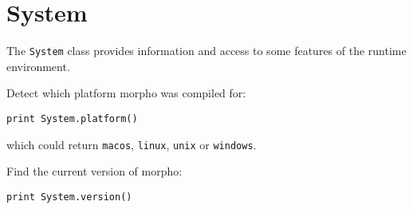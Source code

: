 \hypertarget{system}{%
\section{System}\label{system}}

The \texttt{System} class provides information and access to some
features of the runtime environment.

Detect which platform morpho was compiled for:

\begin{lstlisting}
print System.platform() 
\end{lstlisting}

which could return \texttt{macos}, \texttt{linux}, \texttt{unix} or
\texttt{windows}.

Find the current version of morpho:

\begin{lstlisting}
print System.version() 
\end{lstlisting}
